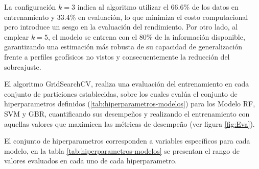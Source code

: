 			La configuración $k=3$ indica al algoritmo utilizar el 66.6\% de los datos en entrenamiento y 33.4\% en evaluación, lo que minimiza el costo computacional pero introduce un sesgo en la evaluación del rendimiento. Por otro lado, al emplear $k=5$, el modelo se entrena con el 80\% de la información disponible, garantizando una estimación más robusta de su capacidad de generalización frente a perfiles geofísicos no vistos y consecuentemente la reducción del sobreajuste.
	
			
			El algoritmo GridSearchCV, realiza una evaluación del entrenamiento en cada conjunto de particiones establecidas, sobre los cuales evalúa el conjunto de hiperparametros definidos  (\ref{tab:hiperparametros-modelos}) para los Modelo RF, SVM y GBR, cuantificando sus desempeños y realizando el entrenamiento con aquellas valores que maximicen las métricas de desempeño (ver figura \ref{fig:Eva}).
			
			El conjunto de hiperparametros corresponden a variables específicos para cada modelo, en la tabla \ref{tab:hiperparametros-modelos} se presentan el rango de valores evaluados en cada uno de cada hiperparametro.
			 
